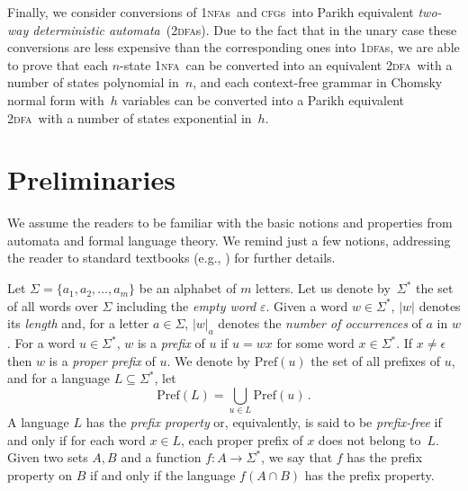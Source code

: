 \documentclass[11pt]{article}
\newcommand*{\tw}{\textsc{2}}
\newcommand*{\twdfa}{\tw\textsc{dfa}}
\newcommand*{\twdfas}{\tw\textsc{dfa}s}
\newcommand*{\ow}{\textsc{1}}
\newcommand*{\owdfas}{\ow\textsc{dfa}s}
\newcommand*{\ownfa}{\ow\textsc{nfa}}
\newcommand*{\ownfas}{\ow\textsc{nfa}s}
\newcommand*{\cfgs}{\textsc{cfg}s}
\newcommand{\Pref}{\ensuremath{\mathrm{Pref}}}
\begin{document}
Finally, we consider conversions of \ownfas\ and \cfgs\ into Parikh equivalent \emph{two-way deterministic
automata}~(\twdfas). Due to the fact that in the unary case these conversions are less expensive than the corresponding
ones into \owdfas, we are able to prove that each $n$-state  \ownfa\ can be converted into an equivalent \twdfa\
with a number of states polynomial in~$n$, and each context-free grammar in Chomsky normal form with~$h$ variables
can be converted into a Parikh equivalent \twdfa\ with a number of states exponential in~$h$.

\section{Preliminaries}
	\label{sec:preliminaries}


We assume the readers to be familiar with the basic notions and properties from automata and formal language
theory. We remind just a few notions, addressing the reader to standard textbooks (e.g., \cite{HopcroftUllman1979,Shallit2008}) 
for further details.

\smallskip

Let $\Sigma = \{a_1, a_2, \ldots, a_m\}$ be an alphabet of $m$ letters. 
Let us denote by~$\Sigma^*$ the set of all words over $\Sigma$ including the \emph{empty word} $\varepsilon$. 
Given a word $w \in \Sigma^*$, $|w|$ denotes its \emph{length} and, for a letter $a \in \Sigma$, $|w|_a$ denotes 
the \emph{number of occurrences} of $a$ in $w$. 
For a word $u \in \Sigma^*$, $w$ is a \emph{prefix} of $u$ if $u = wx$ for some word $x \in \Sigma^*$.
If $x\neq\epsilon$ then $w$ is a \emph{proper prefix} of $u$.
We denote by $\Pref(u)$ the set of all prefixes of $u$, and for a language $L \subseteq \Sigma^*$, let
\[
\Pref(L) = \bigcup_{u \in L} \Pref(u)\,.
\] 
A language $L$ has the \emph{prefix property} or, equivalently, is said to be \emph{prefix-free} if and only if
for each word $x\in L$, each proper prefix of $x$ does not belong to~$L$.
Given two sets $A,B$ and a function $f:A\rightarrow\Sigma^*$, we say that $f$ has the prefix property on $B$ if
and only if the language $f(A\cap B)$ has the prefix property.

\smallskip
\end{document}
